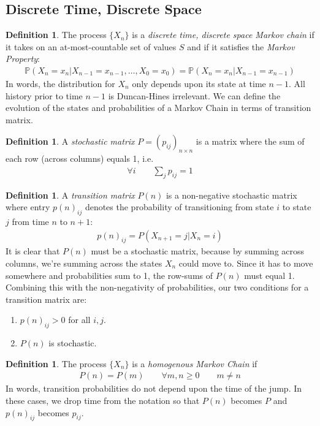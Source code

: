 \documentclass[12pt]{article}
\theoremstyle{plain}
\theoremstyle{definition}
\newtheorem{defn}[thm]{Definition}
\theoremstyle{remark}
\begin{document}
\subsection{Discrete Time, Discrete Space}

\begin{defn}
The process $\{X_n\}$ is a \emph{discrete time, discrete space Markov chain} if it takes on an at-most-countable set of values $S$ and if it
satisfies the \emph{Markov Property}:
\begin{align*}
  \mathbb{P}(X_n = x_n | X_{n-1}=x_{n-1}, \ldots, X_0 =x_0)
  =\mathbb{P}(X_n = x_n | X_{n-1}=x_{n-1})
\end{align*}
In words, the distribution for $X_{n}$ only depends upon its state at
time $n-1$. All history prior to time $n-1$ is Duncan-Hines irrelevant.
We can define the evolution of the states and probabilities of a Markov
Chain in terms of transition matrix.
\end{defn}

\begin{defn}
A \emph{stochastic matrix} $P=(p_{ij})_{n\times n}$ is a matrix where
the sum of each row (across columns) equals 1, i.e.
\begin{align*}
  \forall i \qquad \sum_j p_{ij} = 1
\end{align*}
\end{defn}

\begin{defn}
A \emph{transition matrix} $P(n)$ is a non-negative stochastic matrix
where entry $p(n)_{ij}$ denotes the probability of transitioning from
state $i$ to state $j$ from time $n$ to $n+1$:
\begin{align*}
  p(n)_{ij} = P(X_{n+1}=j | X_n=i)
\end{align*}
It is clear that $P(n)$ must be a stochastic matrix, because by summing
across columns, we're summing across the states $X_n$ could move to.
Since it has to move somewhere and probabilities sum to 1, the row-sums
of $P(n)$ must equal 1. Combining this with the non-negativity of
probabilities, our two conditions for a transition matrix are:
\begin{enumerate}
  \item $p(n)_{ij}>0$ for all $i,j$.
  \item $P(n)$ is stochastic.
\end{enumerate}
\end{defn}

\begin{defn}
The process $\{X_n\}$ is a \emph{homogenous Markov Chain} if
\begin{align*}
  P(n) = P(m) \qquad \forall m,n\geq 0 \qquad m\neq n
\end{align*}
In words, transition probabilities do not depend upon the time of the
jump. In these cases, we drop time from the notation so that $P(n)$
becomes $P$ and $p(n)_{ij}$ becomes $p_{ij}$.
\end{defn}
\end{document}
